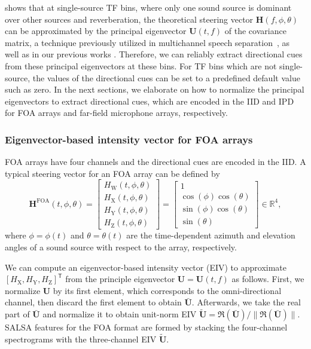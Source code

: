\documentclass[journal]{IEEEtran}
\newcommand{\mbf}{\mathbf}
\newcommand{\T}{\mathsf{T}}
\begin{document}
 shows that at single-source TF bins, where only one sound source is dominant over other sources and reverberation, the theoretical steering vector $\mathbf{H}(f,\phi, \theta)$ can be approximated by the principal eigenvector $\mathbf{U}(t, f)$ of the covariance matrix, a technique previously utilized in multichannel speech separation~\cite{Asano2007DetectionArray}, as well as in our previous works \cite{Nguyen2014RobustSources, Nguyen2020RobustNetwork}.
Therefore, we can reliably extract directional cues from these principal eigenvectors at these bins. 
For TF bins which are not single-source, the values of the directional cues can be set to a predefined default value such as zero. In the next sections, we elaborate on how to normalize the principal eigenvectors to extract directional cues, which are encoded in the IID and IPD for FOA arrays and far-field microphone arrays, respectively.

\subsubsection{Eigenvector-based intensity vector for FOA arrays}
\label{subsec:eiv}

FOA arrays have four channels and the directional cues are encoded in the IID. A typical steering vector for an FOA array can be defined by
\begin{equation}
    \mbf{H}^\text{FOA}(t,\phi, \theta)
    = \begin{bmatrix}
    H_{\text{W}}(t,\phi, \theta) \\
    H_{\text{X}}(t,\phi, \theta) \\
    H_{\text{Y}}(t,\phi, \theta) \\
    H_{\text{Z}}(t,\phi, \theta) 
    \end{bmatrix} = \begin{bmatrix}
    1 \\
    \cos(\phi) \cos(\theta) \\
    \sin(\phi) \cos(\theta) \\
    \sin(\theta)
    \end{bmatrix} \in \mathbb{R}^{4},
\label{eq:foa_steervec}
\end{equation} \nobreak
where $\phi=\phi(t)$ and $\theta=\theta(t)$ are the time-dependent azimuth and elevation angles of a sound source with respect to the array, respectively.

We can compute an eigenvector-based intensity vector (EIV) to approximate $[H_{\text{X}}, H_{\text{Y}}, H_{\text{Z}}]^\T$ from the principle eigenvector ${\mathbf{U}=\mathbf{U}(t,f)}$ as follows. First, we normalize $\mathbf{U}$ by its first element, which corresponds to the omni-directional channel, then discard the first element to obtain $\mathbf{\bar{U}}$. Afterwards, we take the real part of $\mathbf{\bar{U}}$ and normalize it to obtain unit-norm EIV $\mathbf{\widetilde{U}} = \Re(\mathbf{\bar{U}})/\|\Re(\mathbf{\bar{U}})\|$. SALSA features for the FOA format are formed by stacking the four-channel spectrograms with the three-channel EIV $\mathbf{\widetilde{U}}$. 
\end{document}
